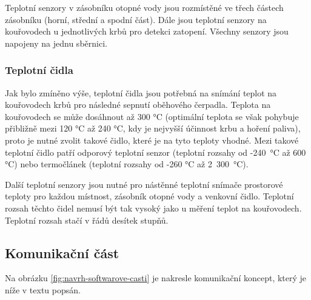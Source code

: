 Teplotní senzory v zásobníku otopné vody jsou rozmístěné ve třech částech zásobníku (horní, střední a spodní část). Dále jsou teplotní senzory na kouřovodech u jednotlivých krbů pro detekci zatopení. Všechny senzory jsou napojeny na jednu sběrnici.



\subsubsection{Teplotní čidla}
Jak bylo zmíněno výše, teplotní čidla jsou potřebná na snímání teplot na kouřovodech krbů pro následné sepnutí oběhového čerpadla. Teplota na kouřovodech se může dosáhnout až 300 °C (optimální teplota se však pohybuje přibližně mezi 120 °C až 240 °C, kdy je nejvyšší účinnost krbu a hoření paliva), proto je nutné zvolit takové čidlo, které je na tyto teploty vhodné. Mezi takové teplotní čidlo patří odporový teplotní senzor (teplotní rozsahy od -240~°C až 600 °C) nebo termočlánek (teplotní rozsahy od -260 °C až 2~300~°C). %


Další teplotní senzory jsou nutné pro nástěnné teplotní snímače prostorové teploty pro každou místnost, zásobník otopné vody a venkovní čidlo. Teplotní rozsah těchto čidel nemusí být tak vysoký jako u měření teplot na kouřovodech. Teplotní rozsah stačí v řádů desítek stupňů. %

\subsection{Komunikační část}

Na obrázku \ref{fig:navrh-softwarove-casti} je nakresle komunikační koncept, který je níže v textu popsán.

